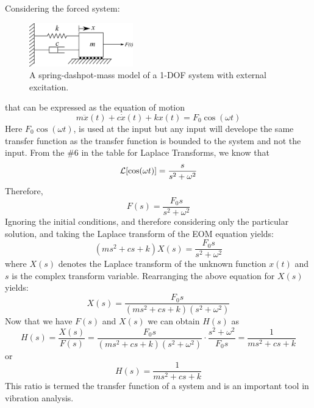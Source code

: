 \documentclass[12pt,letter]{article}
\begin{document}
Considering the forced system:
\begin{figure}[H]
	\centering
	\includegraphics[width=0.4\textwidth]{../figures/1-DOF-spring_dashpot_mass_horizontal_forced.png}
	\caption{A spring-dashpot-mass model of a 1-DOF system with external excitation.}
\end{figure}
\noindent that can be expressed as the equation of motion
\begin{equation}
	m\ddot{x}(t) + c\dot{x}(t) +kx(t) = F_0 \cos(\omega t)
\end{equation}
Here $F_0 \cos(\omega t)$, is used at the input but any input will develope the same transfer function as the transfer function is bounded to the system and not the input. From the \#6 in the table for Laplace Transforms, we know that
\begin{equation}
	\mathcal{L}{\left[\cos(\omega t)\right]} = \frac{s}{s^2+\omega^2}
\end{equation}
Therefore, 
\begin{equation}
F(s) = \frac{F_0s}{s^2+\omega^2}
\end{equation}
Ignoring the initial conditions, and therefore considering only the particular solution, and taking the Laplace transform of the EOM equation yields:
\begin{equation}
(ms^2 + cs +k)X(s) = \frac{F_0s}{s^2+\omega^2} 
\end{equation}
where $X(s)$ denotes the Laplace transform of the unknown function $x(t)$ and $s$ is the complex transform variable. Rearranging the above equation for $X(s)$ yields: 
\begin{equation}
X(s) = \frac{F_0s}{(ms^2 + cs +k)(s^2+\omega^2)}
\end{equation}
Now that we have $F(s)$ and $X(s)$ we can obtain $H(s)$ as  
\begin{equation}
H(s) = \frac{X(s)}{F(s)} = \frac{F_0s}{(ms^2 + cs +k)(s^2+\omega^2)} \cdot \frac{s^2+\omega^2}{F_0s} = \frac{1}{ms^2+cs+k}
\end{equation}
or 
\begin{equation}
H(s) = \frac{1}{ms^2+cs+k}
\end{equation}
This ratio is termed the transfer function of a system and is an important tool in vibration analysis.
\end{document}
